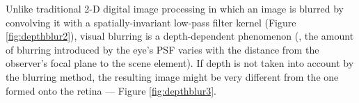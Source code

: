 Unlike traditional 2-D digital image processing in which an image is blurred by convolving it with a spatially-invariant low-pass filter kernel (Figure \ref{fig:depthblur2}), visual blurring is a depth-dependent phenomenon (\ie, the amount of blurring introduced by the eye's PSF varies with the distance from the observer's focal plane to the scene element). If depth is not taken into account by the blurring method, the resulting image might be very different from the one formed onto the retina --- Figure \ref{fig:depthblur3}.

\begin{figure}

	\centering

	
	


\end{figure}
